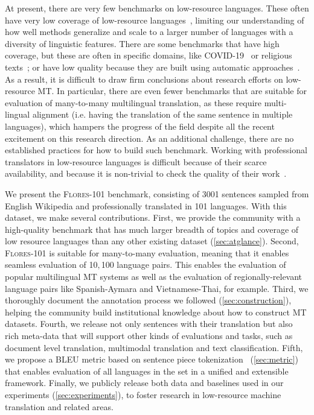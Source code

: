 At present, there are very few benchmarks on low-resource languages. These often have very low coverage of low-resource languages~\citep{riza2016introduction,thu-etal-2016-introducing,guzman-etal-2019-flores,barrault-EtAl:2020:WMT1,nekoto2020participatory,ebrahimi2021americasnli,kuwanto2021low}, limiting our understanding of how well methods generalize and scale to a larger number of languages with a diversity of linguistic features. There are some benchmarks that have high coverage, but these are often in specific domains, like COVID-19~\cite{tico19} or religious texts~\cite{christodouloupoulos2015massively,malaviya2017learning,tiedemann2018emerging,agic-vulic-2019-jw300}; or have low quality because they are built using automatic approaches~\citep{zhang-etal-2020-improving,schwenk2019ccmatrix,schwenk-etal-2021-wikimatrix}. As a result, it is difficult to draw firm conclusions about research efforts on low-resource MT. In particular, there are even fewer benchmarks that are suitable for evaluation of many-to-many multilingual translation, as these require multi-lingual alignment (i.e. having the translation of the same sentence in multiple languages), which hampers the progress of the field despite all the recent excitement on this research direction. As an additional challenge, there are no established practices for how to build such benchmark. Working with professional translators in low-resource languages is difficult because of their scarce availability, and because it is non-trivial to check the quality of their work~\cite{guzman-etal-2019-flores}.

We present the \textsc{Flores-101} benchmark, consisting of 3001 sentences sampled from English Wikipedia and professionally translated in 101 languages. With this dataset, we make several contributions. First, we provide the community with a high-quality benchmark that has much larger breadth of topics and coverage of low resource languages than any other existing dataset (\textsection\ref{sec:atglance}). Second, \textsc{Flores-101} is suitable for many-to-many evaluation, meaning that it enables seamless evaluation of 10${},$100 language pairs. This enables the evaluation of popular multilingual MT systems as well as the evaluation of regionally-relevant language pairs like Spanish-Aymara and Vietnamese-Thai, for example. Third, we thoroughly document the annotation process we followed (\textsection\ref{sec:construction}), helping the community build institutional knowledge about how to construct MT datasets. Fourth, we release not only sentences with their translation but also rich meta-data that will support other kinds of evaluations and tasks, such as document level translation, multimodal translation and text classification. Fifth, we propose a BLEU metric based on sentence piece tokenization~\cite{kudo2018sentencepiece} (\textsection\ref{sec:metric}) that enables   evaluation of all languages in the set in a unified and extensible framework. Finally, we publicly release both data and baselines used in our experiments (\textsection\ref{sec:experiments}), to foster research in low-resource machine translation and related areas. 

